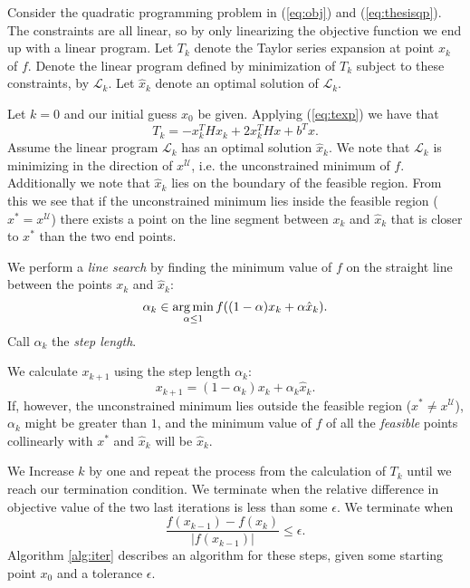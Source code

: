 Consider the quadratic programming problem in (\ref{eq:obj}) and
(\ref{eq:thesisqp}).
The constraints are all linear, so by only linearizing the objective function
we end up with a linear program.
Let $T_k$ denote the Taylor series expansion at point $x_k$ of $f$.
Denote the linear program defined by minimization of $T_k$ subject to these
constraints, by $\mathcal{L}_k$.
Let $\hat{x}_k$ denote an optimal solution of $\mathcal{L}_k$.

Let $k = 0$ and our initial guess $x_0$ be given.
Applying (\ref{eq:texp}) we have that
\[
T_k = - x_k^THx_k + 2x_k^THx + b^Tx.
\]
Assume the linear program $\mathcal{L}_k$ has an optimal solution $\hat{x}_k$.
We note that $\mathcal{L}_k$ is minimizing in the direction of
$x^{\mathcal{U}}$, i.e. the unconstrained minimum of $f$.
Additionally we note that $\hat{x}_k$ lies on the boundary of the feasible
region.
From this we see that if the unconstrained minimum lies inside the feasible
region ($x^* = x^\mathcal{U}$) there exists a point on the line segment between
$x_k$ and $\hat{x}_k$ that is closer to $x^*$ than the two end points.

We perform a \emph{line search} by finding the minimum value of $f$ on the
straight line between the points $x_k$ and $\hat{x}_k$:
\[
\alpha_k \in \operatorname*{arg\,min}_{\alpha \leq 1} f((1-\alpha) x_k + \alpha \hat{x}_k).
\]
Call $\alpha_k$ the \emph{step length}.

We calculate $x_{k+1}$ using the step length $\alpha_k$:
\[
x_{k+1} = (1-\alpha_k) x_k + \alpha_k\hat{x}_k.
\]
If, however, the unconstrained minimum lies outside the feasible region
($x^* \neq x^\mathcal{U}$), $\alpha_k$ might be greater than $1$, and the
minimum value of $f$ of all the \emph{feasible} points collinearly with $x^*$
and $\hat{x}_k$ will be $\hat{x}_k$.

We Increase $k$ by one and repeat the process from the calculation of $T_k$
until we reach our termination condition.
We terminate when the relative difference in objective value of the two last
iterations is less than some $\epsilon$. We terminate when
\[
\frac{f(x_{k-1}) - f(x_k)}{|f(x_{k-1})|} \leq \epsilon.
\]
Algorithm \ref{alg:iter} describes an algorithm for these steps, given some
starting point $x_0$ and a tolerance $\epsilon$.


